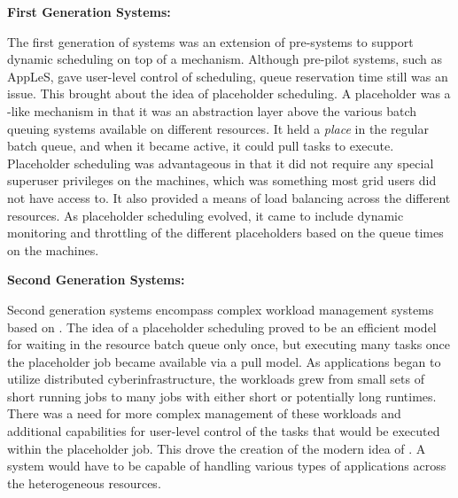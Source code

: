 \documentclass{sig-alternate}
\begin{document}

\textbf{First Generation Systems:} 

The first generation of systems was an extension of pre-\pilot systems to support dynamic scheduling on top of a \pilot mechanism.
Although pre-pilot systems, such as AppLeS, gave user-level control of scheduling, queue reservation time still was an issue. This brought about the idea of placeholder scheduling. A placeholder was a \pilot-like mechanism in that it was an abstraction layer above the various batch queuing systems available on different resources. It held a \textit{place} in the regular batch queue, and when it became active, it could pull tasks to execute. Placeholder scheduling was advantageous in that it did not require any special superuser privileges on the machines, which was something most grid users did not have access to. It also provided a means of load balancing across the different resources. As placeholder scheduling evolved, it came to include dynamic monitoring and throttling of the different placeholders based on the queue times on the machines.


\textbf{Second Generation Systems:}

 Second generation systems encompass complex workload management systems based on \pilots. The idea of a placeholder scheduling proved to be an efficient model for waiting in the resource batch queue only once, but executing many tasks once the placeholder job became available via a pull model. As applications began to utilize distributed cyberinfrastructure, the workloads grew from small sets of short running jobs to many jobs with either short or potentially long runtimes. There was a need for more complex management of these workloads and additional capabilities for user-level control of the tasks that would be executed within the placeholder job. This drove the creation of the modern idea of \pilots. A \pilotjob system would have to be capable of handling various types of applications across the heterogeneous resources.

\end{document}
